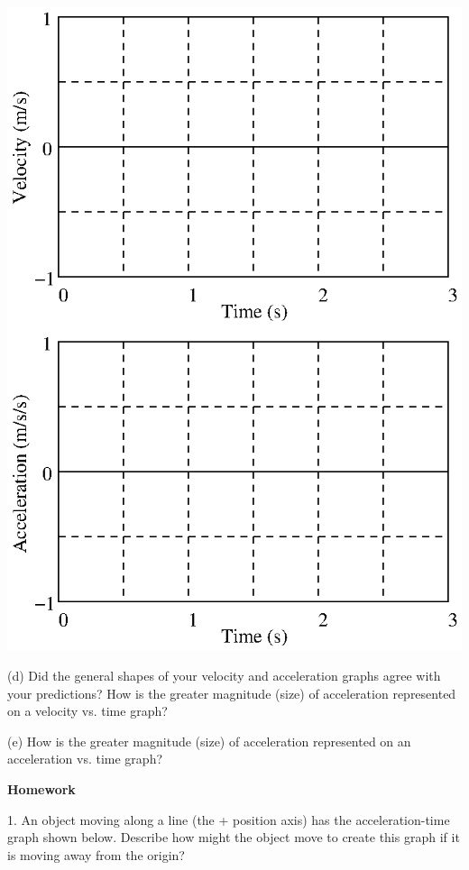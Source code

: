 \vspace{0.3cm}
{\par\centering \includegraphics{changing_fig5.eps} \par}
\vspace{0.3cm}

(d) Did the general shapes of your velocity and acceleration graphs agree with
your predictions? How is the greater magnitude (size) of acceleration represented
on a velocity vs. time graph? 
\vspace{30mm}

(e) How is the greater magnitude (size) of acceleration represented on an acceleration
vs. time graph? 
\vspace{30mm}

\textbf{Homework} 

1. An object moving along a line (the + position axis) has the acceleration-time
graph shown below. Describe how might the object move to create this graph if
it is moving away from the origin?

